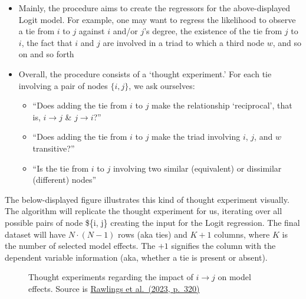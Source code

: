 \documentclass[
  letterpaper,
  DIV=11,
  numbers=noendperiod]{scrartcl}
\providecommand{\tightlist}{%
  \setlength{\itemsep}{0pt}\setlength{\parskip}{0pt}}\usepackage{longtable,booktabs,array}
\begin{document}
\begin{itemize}
\tightlist
\item
  Mainly, the procedure aims to create the regressors for the
  above-displayed Logit model. For example, one may want to regress the
  likelihood to observe a tie from \(i\) to \(j\) against \(i\) and/or
  \(j\)'s degree, the existence of the tie from \(j\) to \(i\), the fact
  that \(i\) and \(j\) are involved in a triad to which a third node
  \(w\), and so on and so forth
\item
  Overall, the procedure consists of a `thought experiment.' For each
  tie involving a pair of nodes \(\{i, j\}\), we ask ourselves:

  \begin{itemize}
  \tightlist
  \item
    ``Does adding the tie from \(i\) to \(j\) make the relationship
    `reciprocal', that is, \(i \rightarrow j\) \& \(j \rightarrow i\)?''
  \item
    ``Does adding the tie from \(i\) to \(j\) make the triad involving
    \(i\), \(j\), and \(w\) transitive?''
  \item
    ``Is the tie from \(i\) to \(j\) involving two similar (equivalent)
    or dissimilar (different) nodes''
  \end{itemize}
\end{itemize}

The below-displayed figure illustrates this kind of thought experiment
visually. The algorithm will replicate the thought experiment for us,
iterating over all possible pairs of node \$\{i, j\} creating the input
for the Logit regression. The final dataset will have \(N \cdot (N -1)\)
rows (aka ties) and \(K + 1\) columns, where \(K\) is the number of
selected model effects. The \(+ 1\) signifies the column with the
dependent variable information (aka, whether a tie is present or
absent).

\begin{figure}


\caption{\label{fig-thought-exp}Thought experiments regarding the impact
of \(i \rightarrow j\) on model effects. Source is
\href{https://www.cambridge.org/core/books/network-analysis/C9202FD5420BE99225FEED4B6214DBB7}{Rawlings
et al.~(2023, p.~320)}}

\end{figure}%
\end{document}
